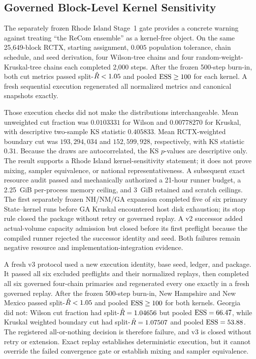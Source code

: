\subsection{Governed Block-Level Kernel Sensitivity}

The separately frozen Rhode Island Stage~1 gate provides a concrete warning
against treating ``the ReCom ensemble'' as a kernel-free object.  On the same
25,649-block RCTX, starting assignment, $0.005$ population tolerance, chain
schedule, and seed derivation, four Wilson-tree chains and four
random-weight-Kruskal-tree chains each completed 2,000 steps.  After the frozen
500-step burn-in, both cut metrics passed split-$\hat{R}<1.05$ and pooled
$\mathrm{ESS}\geq100$ for each kernel.  A fresh sequential execution regenerated all
normalized metrics and canonical snapshots exactly.

Those execution checks did not make the distributions interchangeable.  Mean
unweighted cut fraction was $0.0103331$ for Wilson and $0.00778270$ for
Kruskal, with descriptive two-sample KS statistic $0.405833$.  Mean
RCTX-weighted boundary cut was $193{,}294{,}034$ and $152{,}599{,}928$,
respectively, with KS statistic $0.31$.  Because the draws are autocorrelated,
the KS $p$-values are descriptive only.  The result supports a Rhode Island
kernel-sensitivity statement; it does not prove mixing, sampler equivalence,
or national representativeness.  A subsequent exact resource audit passed and
mechanically authorized a 21-hour runner budget, a 2.25~GiB per-process memory
ceiling, and 3~GiB retained and scratch ceilings.  The first separately frozen
NH/NM/GA expansion completed five of six primary State--kernel runs before GA
Kruskal encountered host disk exhaustion; its stop rule closed the package
without retry or governed replay.  A v2 successor added actual-volume capacity
admission but closed before its first preflight because the compiled runner
rejected the successor identity and seed.  Both failures remain negative
resource and implementation-integration evidence.

A fresh v3 protocol used a new execution identity, base seed, ledger, and
package.  It passed all six excluded preflights and their normalized replays,
then completed all six governed four-chain primaries and regenerated every one
exactly in a fresh governed replay.  After the frozen 500-step burn-in, New
Hampshire and New Mexico passed split-$\hat{R}<1.05$ and pooled $\mathrm{ESS}\geq100$ for
both kernels.  Georgia did not: Wilson cut fraction had split-$\hat{R}=1.04656$
but pooled $\mathrm{ESS}=66.47$, while Kruskal weighted boundary cut had
split-$\hat{R}=1.07507$ and pooled $\mathrm{ESS}=53.88$.  The registered all-or-nothing
decision is therefore failure, and v3 is closed without retry or extension.
Exact replay establishes deterministic execution, but it cannot override the
failed convergence gate or establish mixing and sampler equivalence.
